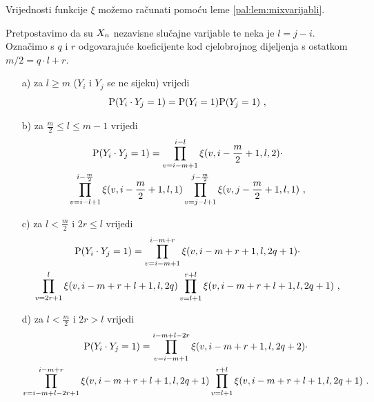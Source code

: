 \noindent
Vrijednosti funkcije $\xi$ možemo računati pomoću leme
\ref{pal:lem:mixvarijabli}.

\begin{pro} \label{pal:pro:opcavjerojatnostpresjeka}
	Pretpostavimo da su $\tsvar{X}_n$ nezavisne slučajne varijable
	te neka je $l = j-i$. Označimo s $q$ i $r$ odgovarajuće
	koeficijente kod cjelobrojnog dijeljenja s ostatkom
	$m/2 = q \cdot l + r$. 
	\begin{itemize}
		\item[a)]{
			za $l \geq m$ ($Y_i$ i $Y_j$ se ne sijeku) vrijedi
			\[
				\vP (\tsvar{Y}_i \cdot \tsvar{Y}_j =1 ) =
				\vP (\tsvar{Y}_i=1) \vP (\tsvar{Y}_j=1) \ ,
			\]
		}
		\item[b)]{
			za $\frac{m}{2} \leq l \leq m-1$ vrijedi
			\begin{multline}
				\vP (\tsvar{Y}_i \cdot \tsvar{Y}_j =1 ) = 
				\prod_{v=i-m+1}^{i-l}
				\xi(v, i-\frac{m}{2}+1, l, 2) \cdot \\
				\prod_{v=i-l+1}^{i-\frac{m}{2}}
				\xi(v, i-\frac{m}{2}+1, l, 1) 
				\prod_{v=j-l+1}^{j-\frac{m}{2}}
				\xi(v, j-\frac{m}{2}+1, l, 1) \ ,
			\end{multline}
		}
		\item[c)]{
			za $l < \frac{m}{2}$ i $2r \leq l$ vrijedi
			\begin{multline}
				\vP (\tsvar{Y}_i \cdot \tsvar{Y}_j =1 ) = 
				\prod_{v=i-m+1}^{i-m+r}
				\xi(v, i-m+r+1, l, 2q+1) \cdot \\
				\prod_{v=2r+1}^{l}
				\xi(v, i-m+r+l+1, l, 2q) 
				\prod_{v=l+1}^{r+l}
				\xi(v, i-m+r+l+1, l, 2q+1) \ ,
			\end{multline}
		}
		\item[d)]{
			za $l < \frac{m}{2}$ i $2r > l$ vrijedi
			\begin{multline}
				\vP (\tsvar{Y}_i \cdot \tsvar{Y}_j =1 ) = 
				\prod_{v=i-m+1}^{i-m+l-2r}
				\xi(v, i-m+r+1, l, 2q+2) \cdot \\
				\prod_{v=i-m+l-2r+1}^{i-m+r}
				\xi(v, i-m+r+l+1, l, 2q+1) 
				\prod_{v=l+1}^{r+l}
				\xi(v, i-m+r+l+1, l, 2q+1) \ .
			\end{multline}
		}

	\end{itemize}
\end{pro}


